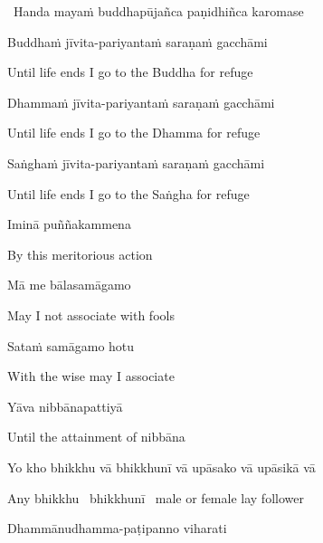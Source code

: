 \begin{leader}
  \anglebracketleft\ \hspace{-0.5mm}Handa mayaṁ buddhapūjañca paṇidhiñca karomase \hspace{-0.5mm}\anglebracketright\
\end{leader}

Buddhaṁ jīvita-pariyantaṁ saraṇaṁ gacchāmi

\begin{english}
  Until life ends I go to the Buddha for refuge
\end{english}

Dhammaṁ jīvita-pariyantaṁ saraṇaṁ gacchāmi

\begin{english}
  Until life ends I go to the Dhamma for refuge
\end{english}

Saṅghaṁ jīvita-pariyantaṁ saraṇaṁ gacchāmi

\begin{english}
  Until life ends I go to the Saṅgha for refuge
\end{english}

Iminā puññakammena

\begin{english}
  By this meritorious action
\end{english}

Mā me bālasamāgamo

\begin{english}
  May I not associate with fools
\end{english}

Sataṁ samāgamo hotu

\begin{english}
  With the wise may I associate
\end{english}

Yāva nibbānapattiyā

\begin{english}
  Until the attainment of nibbāna
\end{english}


Yo kho bhikkhu vā bhikkhunī vā upāsako vā upāsikā vā

\begin{english}
  Any bhikkhu \breathmark\ bhikkhunī \breathmark\ male or female lay follower
\end{english}

Dhammānudhamma-paṭipanno viharati

